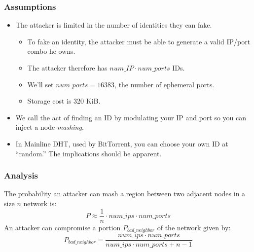 \documentclass[11pt]{beamer}
\begin{document}
\begin{frame}
\frametitle{Assumptions}
	\begin{itemize}
		\item The attacker is limited in the number of identities they can fake.		
		\begin{itemize}
			\item To fake an identity, the attacker must be able to generate a valid IP/port combo he owns.
			\item The attacker therefore has $num\_IP \cdot num\_ports$ IDs.
			\item We'll set $ num\_ports = 16383 $, the number of ephemeral ports.
			\item Storage cost is 320 KiB.
		\end{itemize}
		\item We call the act of finding an ID by modulating your IP and port so you can inject a node \emph{mashing}.
		\item In Mainline DHT, used by BitTorrent, you can choose your own ID at ``random.''   The implications should be apparent.
	
	\end{itemize}
\end{frame}

\begin{frame}
    \frametitle{Analysis}
    The probability an attacker can mash a region between two adjacent nodes in a size $n$ network is:
     \begin{equation}
    P \approx \frac{1}{n}\cdot num\_ips \cdot num\_ports
    \end{equation}
    An attacker can compromise a portion $ P_{bad\_neighbor} $ of the network given by:
    \begin{equation}
    P_{bad\_neighbor} =  \frac{num\_ips \cdot num\_ports}{num\_ips \cdot num\_ports + n - 1}
    \label{eq:bad}
    \end{equation}
    
\end{frame}
\end{document}
